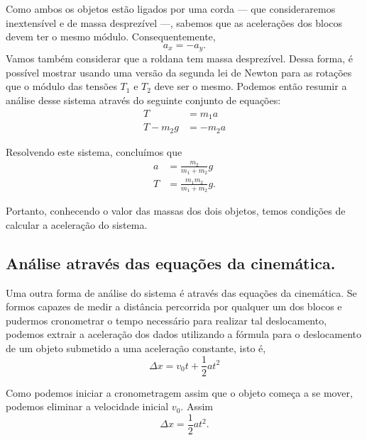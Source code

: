 Como ambos os objetos estão ligados por uma corda --- que consideraremos inextensível e de massa desprezível ---, sabemos que as acelerações dos blocos devem ter o mesmo módulo. Consequentemente,
	\begin{equation}
		a_x = -a_y.
	\end{equation}
%
Vamos também considerar que a roldana tem massa desprezível. Dessa forma, é possível mostrar usando uma versão da segunda lei de Newton para as rotações que o módulo das tensões $T_1$ e $T_2$ deve ser o mesmo. Podemos então resumir a análise desse sistema através do seguinte conjunto de equações:
\begin{align}
	T &= m_1 a\\
	T-m_2g &= -m_2 a
\end{align}

Resolvendo este sistema, concluímos que
\begin{align}
	a &= \frac{m_2}{m_1 + m_2} g \label{EqAceleracao}\\
	T &= \frac{m_1m_2}{m_1+m_2}g.
\end{align}

Portanto, conhecendo o valor das massas dos dois objetos, temos condições de calcular a aceleração do sistema.

\subsection{Análise através das equações da cinemática.}

Uma outra forma de análise do sistema é através das equações da cinemática. Se formos capazes de medir a distância percorrida por qualquer um dos blocos e pudermos cronometrar o tempo necessário para realizar tal deslocamento, podemos extrair a aceleração dos dados utilizando a fórmula para o deslocamento de um objeto submetido a uma aceleração constante, isto é,
	\begin{equation}
		\Delta x = v_0 t + \frac{1}{2} at^2
	\end{equation}

Como podemos iniciar a cronometragem assim que o objeto começa a se mover, podemos eliminar a velocidade inicial $v_0$. Assim
\begin{equation}
	\Delta x = \frac{1}{2} at^2.
\end{equation}

